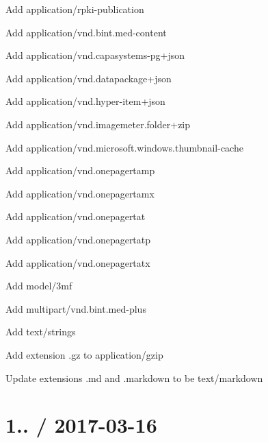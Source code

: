 
\begin{DoxyItemize}
\item Add {\ttfamily application/rpki-\/publication}
\item Add {\ttfamily application/vnd.\+bint.\+med-\/content}
\item Add {\ttfamily application/vnd.\+capasystems-\/pg+json}
\item Add {\ttfamily application/vnd.\+datapackage+json}
\item Add {\ttfamily application/vnd.\+hyper-\/item+json}
\item Add {\ttfamily application/vnd.\+imagemeter.\+folder+zip}
\item Add {\ttfamily application/vnd.\+microsoft.\+windows.\+thumbnail-\/cache}
\item Add {\ttfamily application/vnd.\+onepagertamp}
\item Add {\ttfamily application/vnd.\+onepagertamx}
\item Add {\ttfamily application/vnd.\+onepagertat}
\item Add {\ttfamily application/vnd.\+onepagertatp}
\item Add {\ttfamily application/vnd.\+onepagertatx}
\item Add {\ttfamily model/3mf}
\item Add {\ttfamily multipart/vnd.\+bint.\+med-\/plus}
\item Add {\ttfamily text/strings}
\item Add extension {\ttfamily .gz} to {\ttfamily application/gzip}
\item Update extensions {\ttfamily .md} and {\ttfamily .markdown} to be {\ttfamily text/markdown}
\end{DoxyItemize}

\section*{1.. / 2017-\/03-\/16 }


